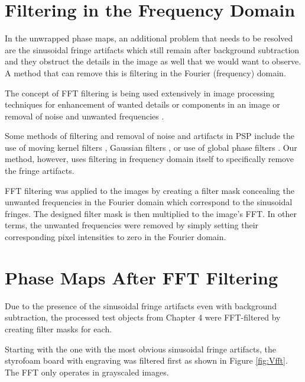 \section{Filtering in the Frequency Domain}

In the unwrapped phase maps, an additional problem that needs to be resolved are the sinusoidal fringe artifacts which still remain after background subtraction and they obstruct the details in the image as well that we would want to observe. A method that can remove this is filtering in the Fourier (frequency) domain.

The concept of FFT filtering is being used extensively in image processing techniques for enhancement of wanted details or components in an image or removal of noise and unwanted frequencies \cite{Gonzalez2002}. 

Some methods of filtering and removal of noise and artifacts in PSP include the use of moving kernel filters \cite{Wang2014a}, Gaussian filters \cite{Feng2013}, or use of global phase filters \cite{Song2014}. Our method, however, uses filtering in frequency domain itself to specifically remove the fringe artifacts.


FFT filtering was applied to the images by creating a filter mask concealing the unwanted frequencies in the Fourier domain which correspond to the sinusoidal fringes. The designed filter mask is then multiplied to the image's FFT. In other terms, the unwanted frequencies were removed by simply setting their corresponding pixel intensities to zero in the Fourier domain.

\section{Phase Maps After FFT Filtering}
Due to the presence of the sinusoidal fringe artifacts even with background subtraction, the processed test objects from Chapter 4 were FFT-filtered by creating filter masks for each. 

Starting with the one with the most obvious sinusoidal fringe artifacts, the styrofoam board with engraving was filtered first as shown in Figure \ref{fig:Vfft}. The FFT only operates in grayscaled images. 

